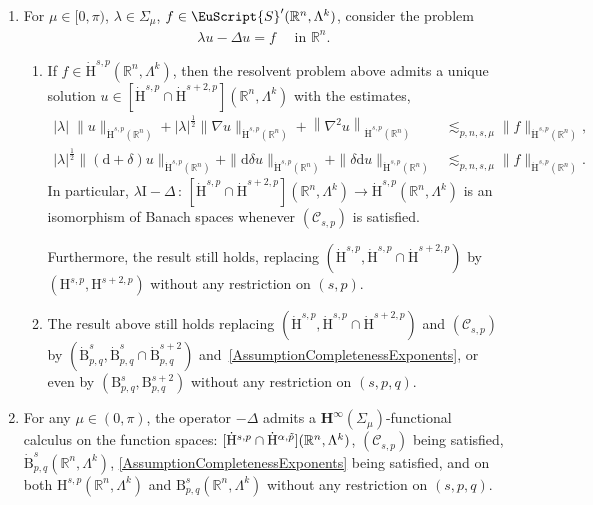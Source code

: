 \documentclass[AHL,Unicode,longabstracts,published]{cedram}
\newcommand{\bbR}{\mathbb{R}}
\newcommand{\rmH}{\mathrm{H}}%
\newcommand{\rmB}{\mathrm{B}}
\newcommand{\rmd}{\mathrm{d}}
\newcommand{\rmI}{\mathrm{I}}
\newcommand{\clC}{\mathcal{C}}
\newcommand{\bfH}{\mathbf{H}}
\newcommand{\eus}{\EuScript}
\let\oldtilde\tilde
\renewcommand*{\tilde}[1]{\mathchoice{\widetilde{#1}}{\widetilde{#1}}{\oldtilde{#1}}{\oldtilde{#1}}}
\begin{document}
\begin{theo}
\begin{enumerate}
\begin{enumerate}
\item\label{theo2.7.1.b} The result still holds if we replace $(\dot{\rmH}^{s,p},\dot{\rmH}^{\alpha,\tilde{p}},\dot{\rmH}^{s+2,p},\dot{\rmH}^{\alpha+2,\tilde{p}})$ by the Besov spaces $(\dot{\rmB}^{s}_{p,q}, \dot{\rmB}^{\alpha}_{\tilde{p},\tilde{q}},\dot{\rmB}^{s+2}_{p,q}, \dot{\rmB}^{\alpha+2}_{\tilde{p},\tilde{q}})$.
\end{enumerate}
\vspace*{3pt}
\item\label{theo2.7.2} For $\mu\in[0,\pi)$, $\lambda\in\Sigma_\mu$, $f\in \eus{S}'(\bbR^n,\Lambda^k)$, consider the problem
\begin{align*}
\lambda u - \Delta u = f\quad\text{ in } \bbR^n.
\end{align*}
\begin{enumerate}
\item\label{theo2.7.2.a} If $f\in \dot{\rmH}^{s,p}(\bbR^n,\Lambda^k)$, then the resolvent problem above admits a unique solution $u\in [\dot{\rmH}^{s,p}\cap \dot{\rmH}^{s+2,p}](\bbR^n,\Lambda^k)$ with the estimates,
\begin{align*}
|\lambda|\;\| u\|_{\dot{\rmH}^{s,p}(\bbR^n)}+|\lambda|^\frac{1}{2}\| \nabla u\|_{\dot{\rmH}^{s,p}(\bbR^n)}+\left\| \nabla^2 u\right\|_{\dot{\rmH}^{s,p}(\bbR^n)} &\lesssim_{p,n,s,\mu} \| f\|_{\dot{\rmH}^{s,p}(\bbR^n)},\\
|\lambda|^\frac{1}{2}\| (\rmd+\delta) u\|_{\dot{\rmH}^{s,p}(\bbR^n)}+\| \rmd\delta u\|_{\dot{\rmH}^{s,p}(\bbR^n)} + \| \delta\rmd u\|_{\dot{\rmH}^{s,p}(\bbR^n)} &\lesssim_{p,n,s,\mu} \| f\|_{\dot{\rmH}^{s,p}(\bbR^n)} .
\end{align*}
In particular, $\lambda \rmI -\Delta\,:\,[\dot{\rmH}^{s,p}\cap \dot{\rmH}^{s+2,{p}}](\bbR^n,\Lambda^k)\longrightarrow \dot{\rmH}^{s,p}(\bbR^n,\Lambda^k)$ is an isomorphism of Banach spaces whenever $(\clC_{s,p})$ is satisfied.

Furthermore, the result still holds, replacing $(\dot{\rmH}^{s,p},\dot{\rmH}^{s,p}\cap \dot{\rmH}^{s+2,{p}})$ by $({\rmH}^{s,p},{\rmH}^{s+2,p})$ without any restriction on $(s,p)$.

\item\label{theo2.7.2.b} The result above still holds replacing $(\dot{\rmH}^{s,p},\dot{\rmH}^{s,p}\cap \dot{\rmH}^{s+2,{p}})$ and $(\clC_{s,p})$ by $(\dot{\rmB}^{s}_{p,q},\dot{\rmB}^{s}_{p,q}\cap \dot{\rmB}^{s+2}_{p,q})$ and~\eqref{AssumptionCompletenessExponents}, or even by $({\rmB}^{s}_{p,q},{\rmB}^{s+2}_{p,q})$ without any restriction on $(s,p,q)$.
\end{enumerate}
\item\label{theo2.7.3} For any $\mu\in(0,\pi)$, the operator $-\Delta$ admits a $\bfH^\infty(\Sigma_\mu)$-functional calculus on the function spaces: $[\dot{\rmH}^{s,p}\cap \dot{\rmH}^{\alpha,\tilde{p}}](\bbR^n,\Lambda^k)$, $(\clC_{s,p})$ being satisfied, $\dot{\rmB}^{s}_{p,q}(\bbR^n,\Lambda^k)$, \eqref{AssumptionCompletenessExponents} being satisfied, and on both ${\rmH}^{s,p}(\bbR^n,\Lambda^k)$ and ${\rmB}^{s}_{p,q}(\bbR^n,\Lambda^k)$ without any restriction on $(s,p,q)$.
\end{enumerate}
\end{theo}
\end{document}
